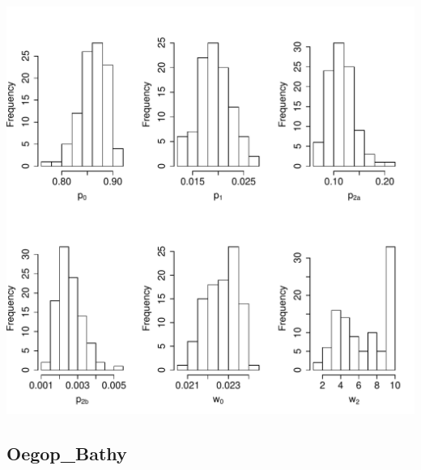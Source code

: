 \documentclass[12pt,letterpaper]{article}\usepackage[]{graphicx}\usepackage[]{color}
\makeatletter
\def\maxwidth{ %
  \ifdim\Gin@nat@width>\linewidth
    \linewidth
  \else
    \Gin@nat@width
  \fi
}
\newenvironment{knitrout}{}{} %
\makeatother
\begin{document}
\begin{knitrout}
\color{fgcolor}

{\centering \includegraphics[width=\maxwidth]{./figures/Loliginidae_plots-1} 

}



\end{knitrout}

\clearpage

\subsection*{Oegop\_Bathy}
\end{document}
